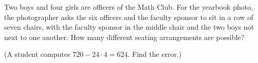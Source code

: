 Two boys and four girls are officers of the Math Club. For the yearbook photo, the photographer asks the six officers and the faculty sponsor to sit in a row of seven chairs, with the faculty sponsor in the middle chair and the two boys not next to one another. How many different seating arrangements are possible?

(A student computes $720-24\cdot4=624$. Find the error.)
